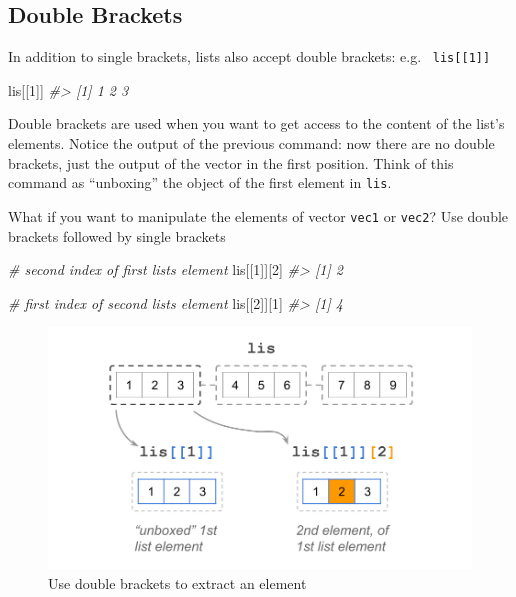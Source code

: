 \documentclass[
]{book}
\newenvironment{Shaded}{\begin{snugshade}}{\end{snugshade}}
\newcommand{\CommentTok}[1]{\textcolor[rgb]{0.56,0.35,0.01}{\textit{#1}}}
\newcommand{\DecValTok}[1]{\textcolor[rgb]{0.00,0.00,0.81}{#1}}
\newcommand{\NormalTok}[1]{#1}
\begin{document}
\hypertarget{double-brackets}{%
\subsection{Double Brackets}\label{double-brackets}}

In addition to single brackets, lists also accept double brackets: e.g.~
\texttt{lis{[}{[}1{]}{]}}

\begin{Shaded}
\begin{Highlighting}[]
\NormalTok{lis[[}\DecValTok{1}\NormalTok{]]}
\CommentTok{\#\textgreater{} [1] 1 2 3}
\end{Highlighting}
\end{Shaded}

Double brackets are used when you want to get access to the content of the
list's elements. Notice the output of the previous command: now there are no
double brackets, just the output of the vector in the first position. Think
of this command as ``unboxing'' the object of the first element in \texttt{lis}.

What if you want to manipulate the elements of vector \texttt{vec1} or \texttt{vec2}? Use
double brackets followed by single brackets

\begin{Shaded}
\begin{Highlighting}[]
\CommentTok{\# second index of first list\textquotesingle{}s element}
\NormalTok{lis[[}\DecValTok{1}\NormalTok{]][}\DecValTok{2}\NormalTok{]}
\CommentTok{\#\textgreater{} [1] 2}

\CommentTok{\# first index of second list\textquotesingle{}s element}
\NormalTok{lis[[}\DecValTok{2}\NormalTok{]][}\DecValTok{1}\NormalTok{]}
\CommentTok{\#\textgreater{} [1] 4}
\end{Highlighting}
\end{Shaded}

\begin{figure}

{\centering \includegraphics[width=0.75\linewidth]{images/objects/obj-list-brackets3} 

}

\caption{Use double brackets to extract an element}\label{fig:unnamed-chunk-123}
\end{figure}
\end{document}
